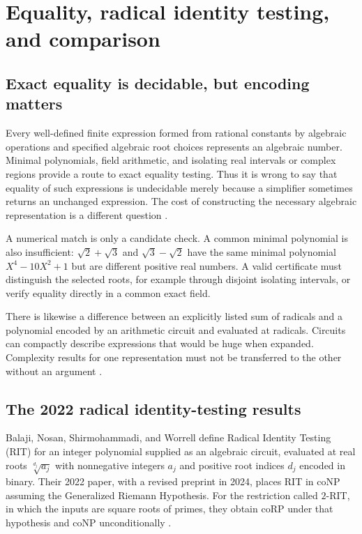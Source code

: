 \documentclass[11pt,letterpaper]{article}
\numberwithin{equation}{section}
\theoremstyle{definition}
\theoremstyle{remark}
\begin{document}
\section{Equality, radical identity testing, and comparison}\label{sec:complexity}

\subsection{Exact equality is decidable, but encoding matters}
Every well-defined finite expression formed from rational constants by algebraic operations and specified algebraic root choices represents an algebraic number. Minimal polynomials, field arithmetic, and isolating real intervals or complex regions provide a route to exact equality testing. Thus it is wrong to say that equality of such expressions is undecidable merely because a simplifier sometimes returns an unchanged expression. The cost of constructing the necessary algebraic representation is a different question \cite{cohen,sage,pari,flint}.

A numerical match is only a candidate check. A common minimal polynomial is also insufficient: $\sqrt2+\sqrt3$ and $\sqrt3-\sqrt2$ have the same minimal polynomial $X^4-10X^2+1$ but are different positive real numbers. A valid certificate must distinguish the selected roots, for example through disjoint isolating intervals, or verify equality directly in a common exact field.

There is likewise a difference between an explicitly listed sum of radicals and a polynomial encoded by an arithmetic circuit and evaluated at radicals. Circuits can compactly describe expressions that would be huge when expanded. Complexity results for one representation must not be transferred to the other without an argument \cite{blomer91,blomer98,rit}.

\subsection{The 2022 radical identity-testing results}
Balaji, Nosan, Shirmohammadi, and Worrell define Radical Identity Testing (RIT) for an integer polynomial supplied as an algebraic circuit, evaluated at real roots $\sqrt[d_j]{a_j}$ with nonnegative integers $a_j$ and positive root indices $d_j$ encoded in binary. Their 2022 paper, with a revised preprint in 2024, places RIT in coNP assuming the Generalized Riemann Hypothesis. For the restriction called $2$-RIT, in which the inputs are square roots of primes, they obtain coRP under that hypothesis and coNP unconditionally \cite{rit}.
\end{document}
